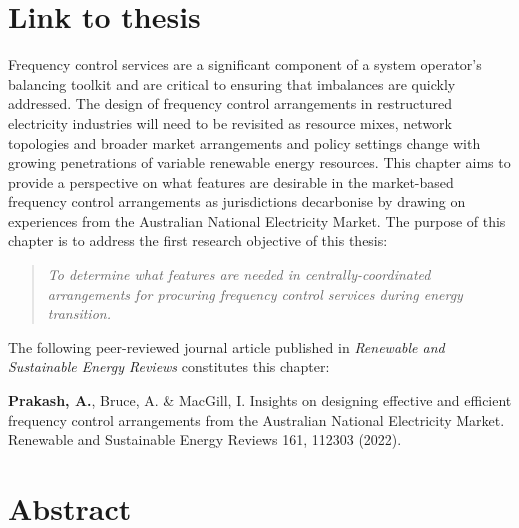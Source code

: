 \documentclass[12pt,a4paper,]{report}
\begin{document}
\hypertarget{link-to-thesis}{%
\section{Link to thesis}\label{link-to-thesis}}

Frequency control services are a significant component of a system
operator's balancing toolkit and are critical to ensuring that
imbalances are quickly addressed. The design of frequency control
arrangements in restructured electricity industries will need to be
revisited as resource mixes, network topologies and broader market
arrangements and policy settings change with growing penetrations of
variable renewable energy resources. This chapter aims to provide a
perspective on what features are desirable in the market-based frequency
control arrangements as jurisdictions decarbonise by drawing on
experiences from the Australian National Electricity Market. The purpose
of this chapter is to address the first research objective of this
thesis:

\begin{quote}
\emph{To determine what features are needed in centrally-coordinated
arrangements for procuring frequency control services during energy
transition.}
\end{quote}

The following peer-reviewed journal article published in \emph{Renewable
and Sustainable Energy Reviews} constitutes this chapter:

\textbf{Prakash, A.}, Bruce, A. \& MacGill, I. Insights on designing
effective and efficient frequency control arrangements from the
Australian National Electricity Market. Renewable and Sustainable Energy
Reviews 161, 112303 (2022).

\hypertarget{abstract-1}{%
\section{Abstract}\label{abstract-1}}
\end{document}
